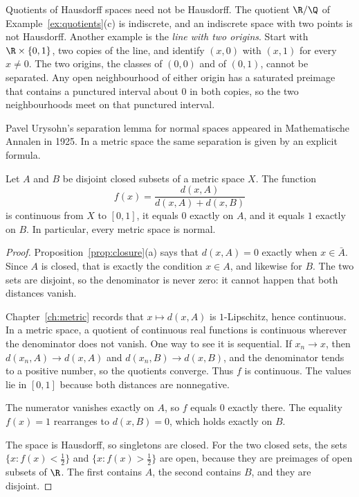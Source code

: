 Quotients of Hausdorff spaces need not be Hausdorff. The quotient $\R/\Q$ of Example~\ref{ex:quotients}(c) is indiscrete, and an indiscrete space with two points is not Hausdorff. Another example is the \emph{line with two origins}. Start with $\R\times\{0,1\}$, two copies of the line, and identify $(x,0)$ with $(x,1)$ for every $x\ne0$. The two origins, the classes of $(0,0)$ and of $(0,1)$, cannot be separated. Any open neighbourhood of either origin has a saturated preimage that contains a punctured interval about $0$ in both copies, so the two neighbourhoods meet on that punctured interval.

Pavel Urysohn's separation lemma for normal spaces appeared in Mathematische Annalen in 1925. In a metric space the same separation is given by an explicit formula.


\begin{proposition}\label{prop:urysohn}
Let $A$ and $B$ be disjoint closed subsets of a metric space $X$. The function
\[
f(x)=\frac{d(x,A)}{d(x,A)+d(x,B)}
\]
is continuous from $X$ to $[0,1]$, it equals $0$ exactly on $A$, and it equals $1$ exactly on $B$. In particular, every metric space is normal.
\end{proposition}
\begin{proof}
Proposition~\ref{prop:closure}(a) says that $d(x,A)=0$ exactly when $x\in\bar A$. Since $A$ is closed, that is exactly the condition $x\in A$, and likewise for $B$. The two sets are disjoint, so the denominator is never zero: it cannot happen that both distances vanish.

Chapter~\ref{ch:metric} records that $x\mapsto d(x,A)$ is $1$-Lipschitz, hence continuous. In a metric space, a quotient of continuous real functions is continuous wherever the denominator does not vanish. One way to see it is sequential. If $x_n\to x$, then $d(x_n,A)\to d(x,A)$ and $d(x_n,B)\to d(x,B)$, and the denominator tends to a positive number, so the quotients converge. Thus $f$ is continuous. The values lie in $[0,1]$ because both distances are nonnegative.

The numerator vanishes exactly on $A$, so $f$ equals $0$ exactly there. The equality $f(x)=1$ rearranges to $d(x,B)=0$, which holds exactly on $B$.

The space is Hausdorff, so singletons are closed. For the two closed sets, the sets $\{x:f(x)<\frac12\}$ and $\{x:f(x)>\frac12\}$ are open, because they are preimages of open subsets of $\R$. The first contains $A$, the second contains $B$, and they are disjoint.
\end{proof}

